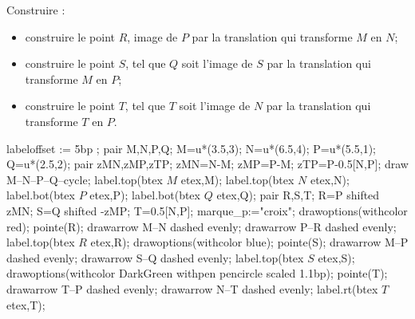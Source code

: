 \begin{corrige}
    Construire :
    \begin{itemize}
        \item construire le point $R$, image de $P$ par la translation qui transforme $M$ en $N$;
        \item construire le point $S$, tel que $Q$ soit l'image de $S$ par la translation qui transforme $M$ en $P$;
        \item construire le point $T$, tel que $T$ soit l'image de $N$ par la translation qui transforme $T$ en $P$.
    \end{itemize}
    \begin{Geometrie}[CoinHD={(9u,5u)}]
        labeloffset := 5bp ;
        pair M,N,P,Q;
        M=u*(3.5,3);
        N=u*(6.5,4);
        P=u*(5.5,1);
        Q=u*(2.5,2);
        pair zMN,zMP,zTP;
        zMN=N-M;
        zMP=P-M;
        zTP=P-0.5[N,P];
        draw M--N--P--Q--cycle;
        label.top(btex $M$ etex,M);
        label.top(btex $N$ etex,N);
        label.bot(btex $P$ etex,P);
        label.bot(btex $Q$ etex,Q);
        pair R,S,T;
        R=P shifted zMN;
        S=Q shifted -zMP;
        T=0.5[N,P];
        marque_p:="croix";
        drawoptions(withcolor red);
        pointe(R);
        drawarrow M--N dashed evenly;
        drawarrow P--R dashed evenly;
        label.top(btex $R$ etex,R);
        drawoptions(withcolor blue);
        pointe(S);        
        drawarrow M--P dashed evenly;
        drawarrow S--Q dashed evenly;
        label.top(btex $S$ etex,S);
        drawoptions(withcolor DarkGreen withpen pencircle scaled 1.1bp);
        pointe(T);
        drawarrow T--P dashed evenly;
        drawarrow N--T dashed evenly;
        label.rt(btex $T$ etex,T);
    \end{Geometrie}
\end{corrige}


